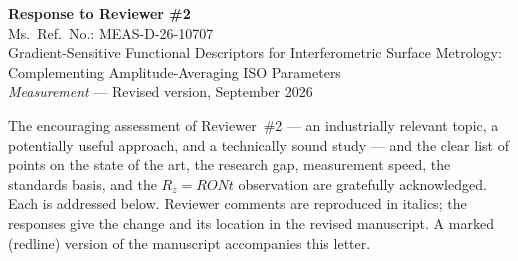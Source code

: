 \documentclass[11pt,a4paper]{article}
\begin{document}
\begin{center}
{\Large\bfseries Response to Reviewer \#2}\\[0.4em]
{\large Ms.\ Ref.\ No.: MEAS-D-26-10707}\\[0.3em]
Gradient-Sensitive Functional Descriptors for Interferometric Surface Metrology:\\
Complementing Amplitude-Averaging ISO Parameters\\[0.3em]
\textit{Measurement} --- Revised version, September 2026
\end{center}

\bigskip

The encouraging assessment of Reviewer~\#2 --- an industrially relevant topic, a potentially useful approach, and a technically sound study --- and the clear list of points on the state of the art, the research gap, measurement speed, the standards basis, and the $R_z=RONt$ observation are gratefully acknowledged. Each is addressed below. Reviewer comments are reproduced in italics; the responses give the change and its location in the revised manuscript. A marked (redline) version of the manuscript accompanies this letter.
\end{document}
